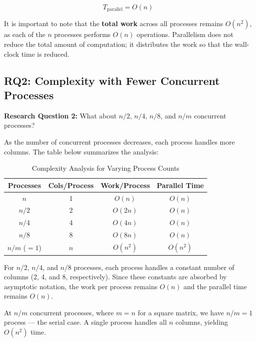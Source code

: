 \documentclass[journal]{IEEEtran}
\begin{document}
\begin{equation}
T_{\text{parallel}} = O(n)
\end{equation}

It is important to note that the \textbf{total work} across all processes remains $O(n^2)$, as each of the $n$ processes performs $O(n)$ operations. Parallelism does not reduce the total amount of computation; it distributes the work so that the wall-clock time is reduced.

\subsection{RQ2: Complexity with Fewer Concurrent Processes}

\textbf{Research Question 2:} What about $n/2$, $n/4$, $n/8$, and $n/m$ concurrent processes?

As the number of concurrent processes decreases, each process handles more columns. The table below summarizes the analysis:

\begin{table}[H]
    \centering
    \caption{Complexity Analysis for Varying Process Counts}
    \label{tab:complexity}
    \footnotesize
    \begin{tabular}{|c|c|c|c|}
        \hline
        \textbf{Processes} & \textbf{Cols/Process} & \textbf{Work/Process} & \textbf{Parallel Time} \\
        \hline
        $n$   & 1 & $O(n)$   & $O(n)$   \\
        \hline
        $n/2$ & 2 & $O(2n)$  & $O(n)$   \\
        \hline
        $n/4$ & 4 & $O(4n)$  & $O(n)$   \\
        \hline
        $n/8$ & 8 & $O(8n)$  & $O(n)$   \\
        \hline
        $n/m$ ($=1$) & $n$ & $O(n^2)$ & $O(n^2)$ \\
        \hline
    \end{tabular}
\end{table}

For $n/2$, $n/4$, and $n/8$ processes, each process handles a constant number of columns (2, 4, and 8, respectively). Since these constants are absorbed by asymptotic notation, the work per process remains $O(n)$ and the parallel time remains $O(n)$.

At $n/m$ concurrent processes, where $m = n$ for a square matrix, we have $n/m = 1$ process --- the serial case. A single process handles all $n$ columns, yielding $O(n^2)$ time.
\end{document}
